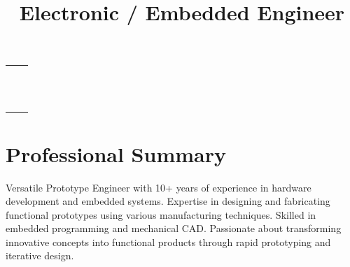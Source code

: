 \documentclass[10pt,letterpaper,roman]{moderncv}        %
\title{Electronic / Embedded Engineer}
\makeatletter
\renewcommand*{\makecvtitle}{%
  \vspace*{-15pt}
  \begin{tabularx}{\textwidth}{@{}X r@{}}
    \begin{minipage}{0.5\textwidth}
      {\Huge\textcolor{burgundy}{\textbf{\@firstname~\@lastname}}}\\[0.4em]
      {\large\color{gray}\textsc{\@title}}
    \end{minipage} &
    \begin{minipage}{0.48\textwidth}
      \raggedleft
      \ifthenelse{\isundefined{\@addressstreet}}{}{\addresssymbol\@addressstreet\\}%
      \ifthenelse{\isundefined{\@addresscity}}{}{\@addresscity\\}%
      \mobilesymbol+1~(215)~690~1415\\
      \ifthenelse{\isundefined{\@email}}{}{\emailsymbol\emaillink{\@email}\\}%
      \ifthenelse{\isundefined{\@homepage}}{}{\homepagesymbol\httplink{\@homepage}\\}%
      \ifthenelse{\isundefined{\@linkedinsocialsymbol}}{}{\@linkedinsocialsymbol\httplink{linkedin.com/in/\@linkedinsocial}\\}%
      \ifthenelse{\isundefined{\@twittersocialsymbol}}{}{\@twittersocialsymbol\httplink{twitter.com/\@twittersocial}\\}%
      \ifthenelse{\isundefined{\@githubsocialsymbol}}{}{\@githubsocialsymbol\httplink{github.com/\@githubsocial}\\}%
      \ifthenelse{\isundefined{\@signalsocialsymbol}}{}{\@signalsocialsymbol\@signalsocial\\}%
    \end{minipage}
  \end{tabularx}
  \par\vspace{2.5em}
}
\makeatother
\begin{document}
\makecvtitle



\section{Professional Summary}
Versatile Prototype Engineer with 10+ years of experience in hardware development and embedded systems. Expertise in designing and fabricating functional prototypes using various manufacturing techniques. Skilled in embedded programming and mechanical CAD. Passionate about transforming innovative concepts into functional products through rapid prototyping and iterative design.
\end{document}

